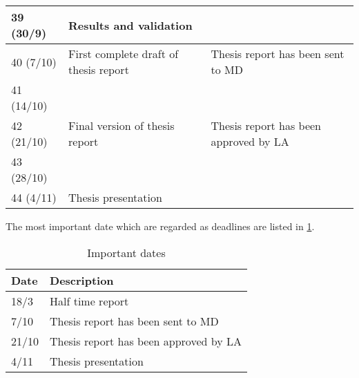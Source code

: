\begin{table}[H]
\begin{tabular}{|p{}|p{}|p{}|}
	39 (30/9)            & Results and validation                &  \\ \hline
	40 (7/10)            & First complete draft of thesis report & Thesis report has been sent to MD                                                                                                     \\ \hline
	41 (14/10)           &                                       &  \\ \hline
	42 (21/10)           & Final version of thesis report        & Thesis report has been approved by LA                                                                                                 \\ \hline
	43 (28/10)           &                                       &  \\ \hline
	44 (4/11)            & Thesis presentation                   &  \\ \hline
\end{tabular}
\end{table}

The most important date which are regarded as deadlines are listed in \cref{table:dates}.


\begin{table}[H]
	\centering
	\caption{Important dates}
	\label{table:dates}
	\begin{tabular}{|p{}|p{}|}
		\hline
		\textbf{Date} & \textbf{Description}                  \\ \hline
		18/3          & Half time report                      \\ \hline
		7/10          & Thesis report has been sent to MD     \\ \hline
		21/10         & Thesis report has been approved by LA \\ \hline
		4/11          & Thesis presentation                   \\ \hline
	\end{tabular}
\end{table}
